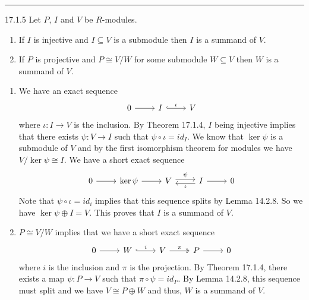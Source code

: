 \documentclass[a4paper, 12pt]{article}
\begin{document}
\noindent\rule{7in}{2.8pt}
\begin{problem}{17.1.5}
Let \(P\), \(I\) and \(V\) be \(R\)-modules.
\begin{enumerate}[(1)]
\item If \(I\) is injective and \(I\subseteq V\) is a submodule then \(I\) is a summand of \(V\). 
\item If \(P\) is projective and \(P\cong V/W\) for some submodule \(W\subseteq V\) then \(W\) is a summand of \(V\).
\end{enumerate}
\end{problem}
\begin{solution}
\begin{enumerate}[(1)]
\item We have an exact sequence 
\[\begin{tikzcd}
	0 & I & V
	\arrow[from=1-1, to=1-2]
	\arrow["\iota", hook, from=1-2, to=1-3]
\end{tikzcd}\]
where \(\iota:I\rightarrow V\) is the inclusion. By Theorem 17.1.4, \(I\) being injective implies that there exists \(\psi:V\rightarrow I\) such that \(\psi\circ \iota=id_I\). We know that 
\(\ker \psi\) is a submodule of \(V\) and by the first isomorphism theorem for modules we have \(V/\ker \psi\cong I\). We have a short exact sequence 
\[\begin{tikzcd}
	0 & {\ker\psi} & V & I & 0
	\arrow[from=1-1, to=1-2]
	\arrow[from=1-2, to=1-3]
	\arrow["\psi", shift left, from=1-3, to=1-4]
	\arrow["\iota", shift left, from=1-4, to=1-3]
	\arrow[from=1-4, to=1-5]
\end{tikzcd}\]
Note that \(\psi\circ \iota=id_i\) implies that this sequence splits by Lemma 14.2.8. So we have \(\ker\psi\oplus I=V\). This proves that \(I\) is a summand of \(V\).
\item \(P\cong V/W\) implies that we have a short exact sequence 
\[\begin{tikzcd}
	0 & W & V & P & 0
	\arrow[from=1-1, to=1-2]
	\arrow["i", hook, from=1-2, to=1-3]
	\arrow["\pi", two heads, from=1-3, to=1-4]
	\arrow[from=1-4, to=1-5]
\end{tikzcd}\]
where \(i\) is the inclusion and \(\pi\) is the projection. By Theorem 17.1.4, there exists a map \(\psi:P\rightarrow V\) such that \(\pi\circ \psi=id_P\). By Lemma 14.2.8, this sequence must split and we have 
\(V\cong P\oplus W\) and thus, \(W\) is a summand of \(V\).
\end{enumerate} 
\end{solution}
\end{document}
